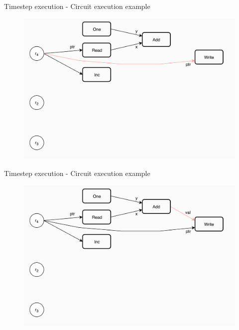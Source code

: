 \documentclass[xcolor={usenames}]{beamer}
\begin{document}
  \begin{frame}{Timestep execution - Circuit execution example}
  	\begin{figure}
  		\centering
  		\includegraphics[width=\textwidth]{../figures/example-circuit-10.png}
  	\end{figure}
  \end{frame}
  \begin{frame}{Timestep execution - Circuit execution example}
  	\begin{figure}
  		\centering
  		\includegraphics[width=\textwidth]{../figures/example-circuit-11.png}
  	\end{figure}
  \end{frame}
\end{document}
